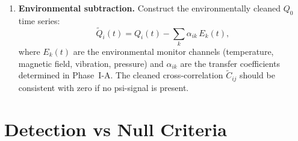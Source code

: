 \documentclass[11pt]{article}
\newcommand{\lam}{\lambda}
\newcommand{\ee}[1]{\times 10^{#1}}
\theoremstyle{definition}
\theoremstyle{remark}
\begin{document}
\begin{enumerate}[label=\textbf{Step \arabic*.}, resume, itemsep=6pt]
  \textbf{Expected signatures}:
  \begin{itemize}[nosep]
  \item \textbf{Psi-field}: $C_{ij}(0) > 0$ for all pairs, with
    amplitude $\propto (\lam-1)^2$. Time lag $\tau_\psi = d_{ij}/c_s
    \sim 0.5~\text{m}/(3\ee{8}~\text{m/s}) \sim 2$~ns (unresolvable
    at 245~s sampling; appears as $\tau = 0$).
  \item \textbf{Temperature drift}: $C_{12}(0) > 0, C_{34}(0) > 0$
    (intra-pair correlated), but $C_{13}(0) \approx 0$ if cryostats
    are thermally independent.
  \item \textbf{Magnetic field}: Similar to temperature, but may be
    partially correlated across cryostats (Schumann resonances,
    building-scale fields).
  \item \textbf{Cosmic rays}: Produces correlated quasiparticle bursts
    in closely spaced cavities ($C_{12}$) but uncorrelated at large
    separations ($C_{13}$).
  \end{itemize}

\item \textbf{Environmental subtraction.}
  Construct the environmentally cleaned $Q_0$ time series:
  \begin{equation}
  \tilde{Q}_i(t) = Q_i(t) - \sum_k \alpha_{ik}\,E_k(t),
  \end{equation}
  where $E_k(t)$ are the environmental monitor channels (temperature,
  magnetic field, vibration, pressure) and $\alpha_{ik}$ are the
  transfer coefficients determined in Phase~I-A. The cleaned
  cross-correlation $\tilde{C}_{ij}$ should be consistent with zero
  if no psi-signal is present.
\end{enumerate}

\section{Detection vs Null Criteria}
\label{sec:detection_criteria}
\end{document}
